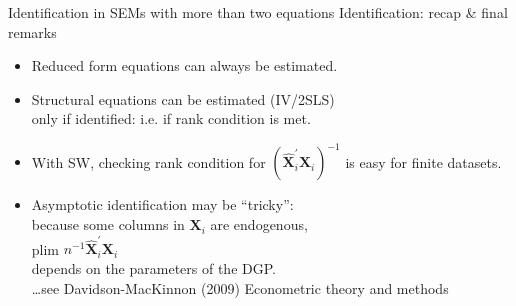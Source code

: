 \documentclass[usenames,dvipsnames]{beamer}
\begin{document}
\begin{frame}{Identification in SEMs with more than two equations}
Identification: recap \& final remarks\\
\bigskip
\begin{itemize}
\item Reduced form equations can always be estimated.\\
\smallskip
\item Structural equations can be estimated (IV/2SLS) \\only if identified: i.e. if rank condition is met.\\
\bigskip
\item With SW, checking rank condition for $\left(\hat{\bm{X}}^{\prime}_i \bm{X}_i \right)^{-1}$ is easy for finite datasets.\\
\smallskip
\item Asymptotic identification may be ``tricky'': \\because some columns in $\bm{X}_i$ are endogenous,\\
\smallskip
plim $n^{-1} \hat{\bm{X}}^{\prime}_i \bm{X}_i$ ~~ \\
\smallskip 
depends on the parameters of the DGP.\\
\medskip
\footnotesize{\dots see Davidson-MacKinnon (2009) Econometric theory and methods}
\end{itemize}
\end{frame}
\end{document}
